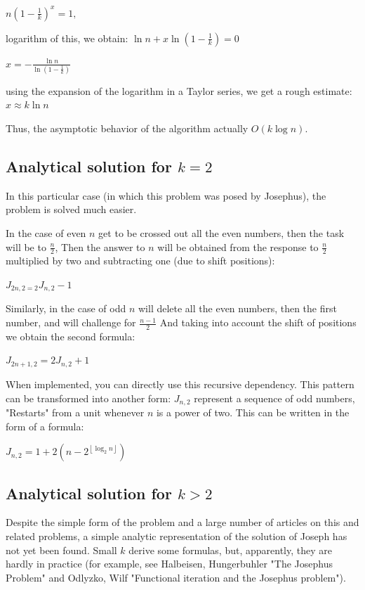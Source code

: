 $n \left (1 - \frac {1} {k} \right) ^ x = 1,$

logarithm of this, we obtain:
$\ln n+x\ln\left(1-\frac{1}{k}\right)=0$

$x=-\frac{\ln n}{\ln\left(1-\frac{1}{k}\right)}$

using the expansion of the logarithm in a Taylor series, we get a rough estimate:
$x \approx k \ln n$

Thus, the asymptotic behavior of the algorithm actually $O (k \log n)$.

\subsection{ Analytical solution for $k = 2$}

In this particular case (in which this problem was posed by Josephus), the problem is solved much easier.

In the case of even $n$ get to be crossed out all the even numbers, then the task will be to $\frac {n} {2}$, Then the answer to $n$ will be obtained from the response to $\frac {n} {2}$ multiplied by two and subtracting one (due to shift positions):

$J_ {2n, 2 = 2} J_ {n, 2} - 1$

Similarly, in the case of odd $n$ will delete all the even numbers, then the first number, and will challenge for $\frac {n-1} {2}$ And taking into account the shift of positions we obtain the second formula:

$J_ {2n +1,2} = 2 J_ {n, 2} + 1$

When implemented, you can directly use this recursive dependency. This pattern can be transformed into another form: $J_ {n, 2}$ represent a sequence of odd numbers, "Restarts" from a unit whenever $n$ is a power of two. This can be written in the form of a formula:

$J_{n,2}=1+2\left(n-2^{\left\lfloor \log_{2}n\right\rfloor }\right)$

\subsection{ Analytical solution for $k> 2$}

Despite the simple form of the problem and a large number of articles on this and related problems, a simple analytic representation of the solution of Joseph has not yet been found. Small $k$ derive some formulas, but, apparently, they are hardly in practice (for example, see Halbeisen, Hungerbuhler "The Josephus Problem" and Odlyzko, Wilf "Functional iteration and the Josephus problem").

